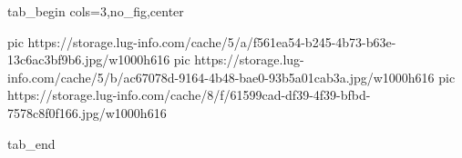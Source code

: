  
 
 
 
 


\ifcmt
  tab_begin cols=3,no_fig,center

     pic https://storage.lug-info.com/cache/5/a/f561ea54-b245-4b73-b63e-13c6ac3bf9b6.jpg/w1000h616%
		 pic https://storage.lug-info.com/cache/5/b/ac67078d-9164-4b48-bae0-93b5a01cab3a.jpg/w1000h616%
		 pic https://storage.lug-info.com/cache/8/f/61599cad-df39-4f39-bfbd-7578c8f0f166.jpg/w1000h616%

  tab_end
\fi
